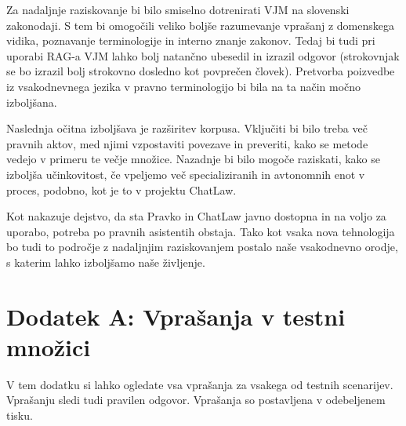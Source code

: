 \documentclass[a4paper,12pt,openright]{book}
\begin{document}
Za nadaljnje raziskovanje bi bilo smiselno dotrenirati VJM na slovenski zakonodaji. S tem bi omogočili veliko boljše razumevanje vprašanj z domenskega vidika, poznavanje terminologije in interno znanje zakonov. Tedaj bi tudi pri uporabi RAG-a VJM lahko bolj natančno ubesedil in izrazil odgovor (strokovnjak se bo izrazil bolj strokovno dosledno kot povprečen človek). Pretvorba poizvedbe iz vsakodnevnega jezika v pravno terminologijo bi bila na ta način močno izboljšana.

Naslednja očitna izboljšava je razširitev korpusa. Vključiti bi bilo treba več pravnih aktov, med njimi vzpostaviti povezave in preveriti, kako se metode vedejo v primeru te večje množice. Nazadnje bi bilo mogoče raziskati, kako se izboljša učinkovitost, če vpeljemo več specializiranih in avtonomnih enot v proces, podobno, kot je to v projektu ChatLaw.

Kot nakazuje dejstvo, da sta Pravko in ChatLaw javno dostopna in na voljo za uporabo, potreba po pravnih asistentih obstaja. Tako kot vsaka nova tehnologija bo tudi to področje z nadaljnjim raziskovanjem postalo naše vsakodnevno orodje, s katerim lahko izboljšamo naše življenje.


\cleardoublepage

\raggedright




\printbibliography[heading=bibintoc,title={Literatura}]

\cleardoublepage

{}
\chapter*{Dodatek A: Vprašanja v testni množici}
\label{appendix_a}

V tem dodatku si lahko ogledate vsa vprašanja za vsakega od testnih scenarijev. Vprašanju sledi tudi pravilen odgovor. Vprašanja so postavljena v odebeljenem tisku.
\end{document}
